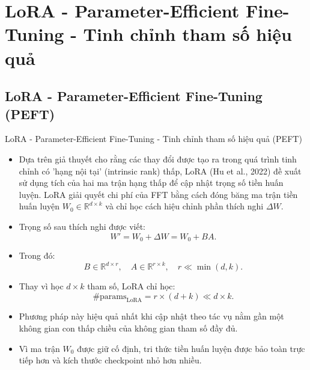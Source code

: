\documentclass[11pt,aspectratio=169]{beamer}
\begin{document}
\section{LoRA - Parameter-Efficient Fine-Tuning - Tinh chỉnh tham số hiệu quả}
\subsection{LoRA - Parameter-Efficient Fine-Tuning (PEFT)}
\begin{frame}[t]{LoRA - Parameter-Efficient Fine-Tuning - Tinh chỉnh tham số hiệu quả (PEFT)}
\scriptsize
\begin{itemize}
\item Dựa trên giả thuyết cho rằng các thay đổi được tạo ra trong quá trình tinh chỉnh có 'hạng nội tại' (intrinsic rank) thấp, LoRA (Hu et al.,
2022) đề xuất sử dụng tích của hai ma trận hạng thấp để cập nhật trọng số tiền huấn luyện. LoRA giải quyết chi phí của FFT bằng cách đóng băng ma trận tiền huấn luyện $W_0\in\mathbb{R}^{d\times k}$ và chỉ học cách hiệu chỉnh phần thích nghi $\Delta W$.
\item Trọng số sau thích nghi được viết:
$$
W' = W_0 + \Delta W = W_0 + BA.
$$
\item Trong đó:
$$
B\in\mathbb{R}^{d\times r}, \quad A\in\mathbb{R}^{r\times k}, \quad r\ll \min(d,k).
$$
\item Thay vì học $d\times k$ tham số, LoRA chỉ học:
$$
\#\text{params}_{\text{LoRA}}=r\times (d+k)\ll d\times k.
$$
\item Phương pháp này hiệu quả nhất khi cập nhật theo tác vụ nằm gần một không gian con thấp chiều của không gian tham số đầy đủ.
\item Vì ma trận $W_0$ được giữ cố định, tri thức tiền huấn luyện được bảo toàn trực tiếp hơn và kích thước checkpoint nhỏ hơn nhiều.
\end{itemize}
\end{frame}
\end{document}
